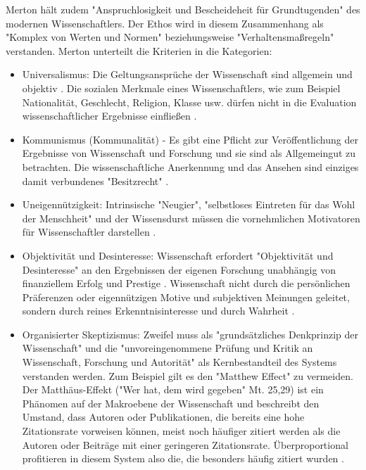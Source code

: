Merton hält zudem "Anspruchlosigkeit und Bescheideheit für Grundtugenden" \cite{hagner_2015_sache_buches} des modernen Wissenschaftlers. Der Ethos wird in diesem Zusammenhang als "Komplex von Werten und Normen"\cite{suchen} beziehungsweise "Verhaltensmaßregeln"\cite{suchen} verstanden. Merton unterteilt die Kriterien in die Kategorien:
\begin{itemize}
\item Universalismus: Die Geltungsansprüche der Wissenschaft sind allgemein und objektiv \cite{Oezmen_2015}. Die sozialen Merkmale eines Wissenschaftlers, wie zum Beispiel Nationalität, Geschlecht, Religion, Klasse usw. dürfen nicht in die Evaluation wissenschaftlicher Ergebnisse einfließen \cite{suchen}.
\item Kommunismus (Kommunalität) - Es gibt eine Pflicht zur Veröffentlichung der Ergebnisse von Wissenschaft und Forschung und sie sind als Allgemeingut zu betrachten. Die wissenschaftliche Anerkennung und das Ansehen sind einziges damit verbundenes "Besitzrecht" \cite{suchen}.
\item Uneigennützigkeit: Intrinsische "Neugier"\cite{suchen}, "selbstloses Eintreten für das Wohl der Menschheit"\cite{suchen} und der Wissensdurst müssen die vornehmlichen Motivatoren für Wissenschaftler darstellen \cite{suchen}.
\item Objektivität und Desinteresse: Wissenschaft erfordert "Objektivität und Desinteresse" an den Ergebnissen der eigenen Forschung \cite{suchen} unabhängig von finanziellem Erfolg und Prestige \cite{suchen}. Wissenschaft nicht durch die persönlichen Präferenzen oder eigennützigen Motive und subjektiven Meinungen geleitet, sondern durch reines Erkenntnisinteresse und durch Wahrheit \cite{Oezmen_2015}.
\item Organisierter Skeptizismus: Zweifel muss als "grundsätzliches Denkprinzip der Wissenschaft" \cite{suchen} und die "unvoreingenommene Prüfung und Kritik an Wissenschaft, Forschung und Autorität" \cite{suchen} als Kernbestandteil des Systems verstanden werden. Zum Beispiel gilt es den "Matthew Effect" zu vermeiden. Der Matthäus-Effekt ("Wer hat, dem wird gegeben" Mt. 25,29) ist ein Phänomen auf der Makroebene der Wissenschaft \cite{bonitz_1998_matthaus} und  beschreibt den Umstand, dass Autoren oder Publikationen, die bereits eine hohe Zitationsrate vorweisen können, meist noch häufiger zitiert werden als die Autoren oder Beiträge mit einer geringeren Zitationsrate. Überproportional profitieren in diesem System also die, die besonders häufig zitiert wurden \cite{Merton_1968} \cite{meier_2009_matthaus}.
\end{itemize}

